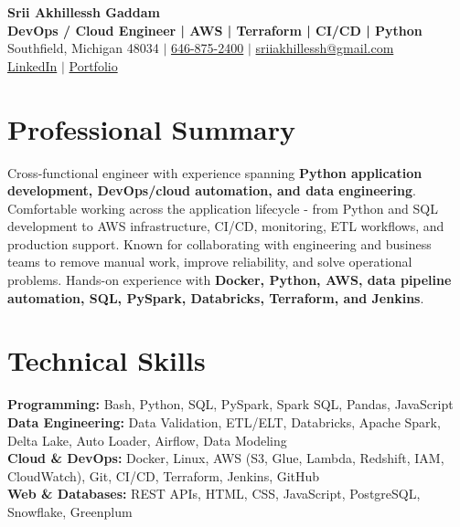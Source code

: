 \documentclass[letterpaper,10pt]{article}
\begin{document}
\fontsize{9.35pt}{10.45pt}\selectfont

\begin{center}
    {\LARGE \textbf{Srii Akhillessh Gaddam}} \\[-1pt]
    \textbf{DevOps / Cloud Engineer | AWS | Terraform | CI/CD | Python} \\[2pt]
    Southfield, Michigan 48034 $|$
    \href{tel:6468752400}{646-875-2400} $|$
    \href{mailto:sriiakhillessh@gmail.com}{sriiakhillessh@gmail.com} \\[1pt]
    \href{https://www.linkedin.com/in/srii-akhiilessh-gaddam-b48668191/}{LinkedIn} $|$
    \href{https://sriiakhillesshg.github.io/portfolio/}{Portfolio}
\end{center}
\vspace{-8pt}

\section{Professional Summary}
\small{Cross-functional engineer with experience spanning \textbf{Python application development, DevOps/cloud automation, and data engineering}. Comfortable working across the application lifecycle - from Python and SQL development to AWS infrastructure, CI/CD, monitoring, ETL workflows, and production support. Known for collaborating with engineering and business teams to remove manual work, improve reliability, and solve operational problems. Hands-on experience with \textbf{Docker, Python, AWS, data pipeline automation, SQL, PySpark, Databricks, Terraform, and Jenkins}.}

\section{Technical Skills}
\small{
\textbf{Programming:} Bash, Python, SQL, PySpark, Spark SQL, Pandas, JavaScript \\
\textbf{Data Engineering:} Data Validation, ETL/ELT, Databricks, Apache Spark, Delta Lake, Auto Loader, Airflow, Data Modeling \\
\textbf{Cloud \& DevOps:} Docker, Linux, AWS (S3, Glue, Lambda, Redshift, IAM, CloudWatch), Git, CI/CD, Terraform, Jenkins, GitHub \\
\textbf{Web \& Databases:} REST APIs, HTML, CSS, JavaScript, PostgreSQL, Snowflake, Greenplum
}
\end{document}
